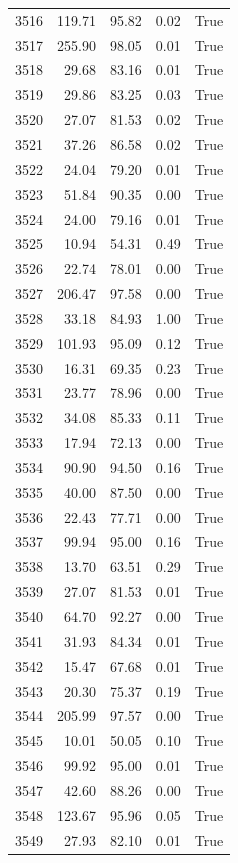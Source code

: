 \begin{longtable}{rrrrr}
3516 & 119.71 & 95.82 & 0.02 & True \\
3517 & 255.90 & 98.05 & 0.01 & True \\
3518 & 29.68 & 83.16 & 0.01 & True \\
3519 & 29.86 & 83.25 & 0.03 & True \\
3520 & 27.07 & 81.53 & 0.02 & True \\
3521 & 37.26 & 86.58 & 0.02 & True \\
3522 & 24.04 & 79.20 & 0.01 & True \\
3523 & 51.84 & 90.35 & 0.00 & True \\
3524 & 24.00 & 79.16 & 0.01 & True \\
3525 & 10.94 & 54.31 & 0.49 & True \\
3526 & 22.74 & 78.01 & 0.00 & True \\
3527 & 206.47 & 97.58 & 0.00 & True \\
3528 & 33.18 & 84.93 & 1.00 & True \\
3529 & 101.93 & 95.09 & 0.12 & True \\
3530 & 16.31 & 69.35 & 0.23 & True \\
3531 & 23.77 & 78.96 & 0.00 & True \\
3532 & 34.08 & 85.33 & 0.11 & True \\
3533 & 17.94 & 72.13 & 0.00 & True \\
3534 & 90.90 & 94.50 & 0.16 & True \\
3535 & 40.00 & 87.50 & 0.00 & True \\
3536 & 22.43 & 77.71 & 0.00 & True \\
3537 & 99.94 & 95.00 & 0.16 & True \\
3538 & 13.70 & 63.51 & 0.29 & True \\
3539 & 27.07 & 81.53 & 0.01 & True \\
3540 & 64.70 & 92.27 & 0.00 & True \\
3541 & 31.93 & 84.34 & 0.01 & True \\
3542 & 15.47 & 67.68 & 0.01 & True \\
3543 & 20.30 & 75.37 & 0.19 & True \\
3544 & 205.99 & 97.57 & 0.00 & True \\
3545 & 10.01 & 50.05 & 0.10 & True \\
3546 & 99.92 & 95.00 & 0.01 & True \\
3547 & 42.60 & 88.26 & 0.00 & True \\
3548 & 123.67 & 95.96 & 0.05 & True \\
3549 & 27.93 & 82.10 & 0.01 & True \\

\end{longtable}
